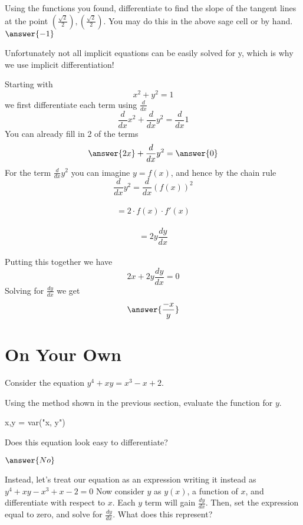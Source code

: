 \documentclass{ximera}
\begin{document}
\begin{question}
Using the functions you found, differentiate to find the slope of the tangent lines at the point $(\frac{\sqrt{2}}{2}),(\frac{\sqrt{2}}{2})$. You may do this in the above sage cell or by hand.
$\answer{-1}$
\end{question}
Unfortunately not all implicit equations can be easily solved for y, which is why we use implicit differentiation!
\begin{explanation}
Starting with
$$x^2 + y^2 = 1$$
we first differentiate each term using $\frac{d}{dx}$
$$\frac{d}{dx}x^2+\frac{d}{dx}y^2 = \frac{d}{dx} 1$$
You can already fill in 2 of the terms
$$ \answer{2x}+ \frac{d}{dx}y^2 = \answer{0}$$
For the term $\frac{d}{dx} y^2$ you can imagine $y = f(x)$, and hence by the chain rule
 $$\frac{d}{dx} y^2 = \frac{d}{dx}(f(x))^2 $$ \\
 $$= 2\cdot f(x) \cdot f'(x) $$ \\
 $$= 2y\frac{dy}{dx}$$ \\
 Putting this together we have
 $$2x + 2y\frac{dy}{dx} =0$$
Solving for $\frac{dy}{dx}$ we get 
$$\answer{\frac{-x}{y}}$$
\end{explanation}
\section{On Your Own}
Consider the equation $y^4+xy=x^3-x+2$.
\begin{question}
Using the method shown in the previous section, evaluate the function for $y$.
\begin{onlineOnly}
\begin{sageCell}
x,y = var("x, y")
\end{sageCell}
\end{onlineOnly}
Does this equation look easy to differentiate?

$\answer{No}$

Instead, let's treat our equation as an expression writing it instead as $y^4+xy-x^3+x-2=0$ Now consider $y$ as $y(x)$, a function of $x$, and differentiate with respect to $x$. Each $y$ term will gain $\frac{dy}{dx}$. Then, set the expression equal to zero, and solve for $\frac{dy}{dx}$. What does this represent?
\begin{freeResponse}
\end{freeResponse}
\end{question}
\end{document}

